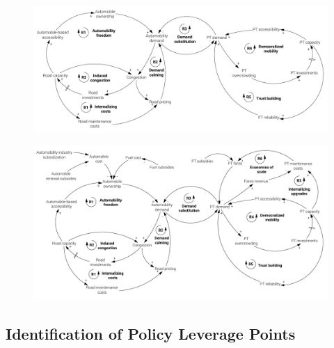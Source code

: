 \begin{figure}[h]
\includegraphics[width=1.1\textwidth,center]{figures/model/cropped/public-transport_2_trust.pdf}
\label{f:results:cld_pt_2}
\caption[]{}
\end{figure}

\begin{figure}
\includegraphics[width=1.2\textwidth,center]{figures/model/cropped/public-transport_3_final.pdf}
\label{f:results:cld_pt_3}
\caption[]{}
\end{figure}

\subsection{Identification of Policy Leverage Points}
\label{ss:results:cld_policy-leverage-points}